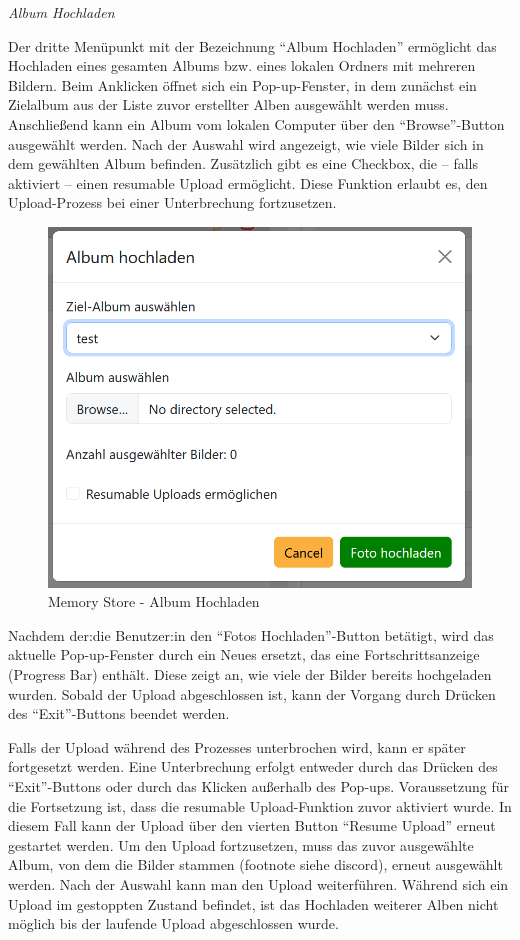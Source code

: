 {\textit{Album Hochladen}}


Der dritte Menüpunkt mit der Bezeichnung ``Album Hochladen'' ermöglicht das Hochladen eines gesamten Albums bzw. eines lokalen Ordners mit mehreren Bildern. Beim Anklicken öffnet sich ein Pop-up-Fenster, in dem zunächst ein Zielalbum aus der Liste zuvor erstellter Alben ausgewählt werden muss. Anschlie\ss{}end kann ein Album vom lokalen Computer über den ``Browse''-Button ausgewählt werden. Nach der Auswahl wird angezeigt, wie viele Bilder sich in dem gewählten Album befinden. Zusätzlich gibt es eine Checkbox, die – falls aktiviert – einen resumable Upload ermöglicht. Diese Funktion erlaubt es, den Upload-Prozess bei einer Unterbrechung fortzusetzen.

\begin{figure}
    \centering
    \includegraphics[scale=0.4]{pics/memory_store_teil1_button3.PNG}
    \caption{Memory Store - Album Hochladen}
    \label{fig:memory-store-album-hochladen}
\end{figure}

Nachdem der:die Benutzer:in den ``Fotos Hochladen''-Button betätigt, wird das aktuelle Pop-up-Fenster durch ein Neues ersetzt, das eine Fortschrittsanzeige (Progress Bar) enthält. Diese zeigt an, wie viele der Bilder bereits hochgeladen wurden. Sobald der Upload abgeschlossen ist, kann der Vorgang durch Drücken des ``Exit''-Buttons beendet werden.

Falls der Upload während des Prozesses unterbrochen wird, kann er später fortgesetzt werden. Eine Unterbrechung erfolgt entweder durch das Drücken des ``Exit''-Buttons oder durch das Klicken au\ss{}erhalb des Pop-ups. Voraussetzung für die Fortsetzung ist, dass die resumable Upload-Funktion zuvor aktiviert wurde. In diesem Fall kann der Upload über den vierten Button ``Resume Upload'' erneut gestartet werden. Um den Upload fortzusetzen, muss das zuvor ausgewählte Album, von dem die Bilder stammen (footnote siehe discord), erneut ausgewählt werden. Nach der Auswahl kann man den Upload weiterführen. Während sich ein Upload im gestoppten Zustand befindet, ist das Hochladen weiterer Alben nicht möglich bis der laufende Upload abgeschlossen wurde.

